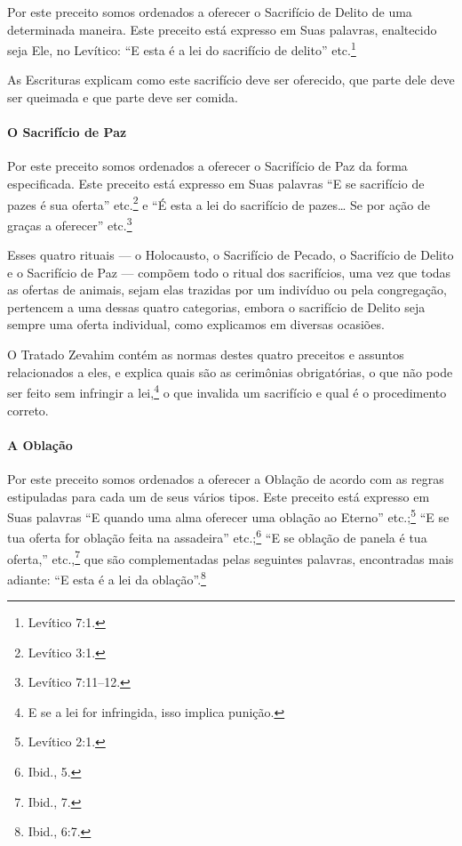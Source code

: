 \begin{multicols}{2}
Por este preceito somos ordenados a oferecer o Sacrifício de Delito de
uma determinada maneira. Este preceito está expresso em Suas palavras,
enaltecido seja Ele, no Levítico: ``E esta é a lei do sacrifício de
delito'' etc.\footnote{Levítico 7:1.}

As Escrituras explicam como este sacrifício deve ser oferecido, que
parte dele deve ser queimada e que parte deve ser comida.

\paragraph{O Sacrifício de Paz}

Por este preceito somos ordenados a oferecer o Sacrifício de Paz da
forma especificada. Este preceito está expresso em Suas palavras ``E se
sacrifício de pazes é sua oferta'' etc.\footnote{Levítico 3:1.} e ``É esta a lei
do sacrifício de pazes\ldots{} Se por ação de graças a oferecer'' etc.\footnote{Levítico 7:11--12.}

Esses quatro rituais --- o Holocausto, o Sacrifício de Pecado, o
Sacrifício de Delito e o Sacrifício de Paz --- compõem todo o ritual
dos sacrifícios, uma vez que todas as ofertas de animais, sejam elas
trazidas por um indivíduo ou pela congregação, pertencem a uma dessas
quatro categorias, embora o sacrifício de Delito seja sempre uma oferta
individual, como explicamos em diversas ocasiões.

O Tratado Zevahim\starr{} contém as normas destes quatro preceitos e assuntos
relacionados a eles, e explica quais são as cerimônias obrigatórias, o
que não pode ser feito sem infringir a lei,\footnote{E se a lei for infringida, isso implica punição.} o que
invalida um sacrifício e qual é o procedimento correto.

\paragraph{A Oblação}

Por este preceito somos ordenados a oferecer a Oblação de acordo com as
regras estipuladas para cada um de seus vários tipos. Este preceito está
expresso em Suas palavras ``E quando uma alma oferecer uma oblação ao
Eterno'' etc.;\footnote{Levítico 2:1.} ``E se tua oferta for oblação feita na
assadeira'' etc.;\footnote{Ibid., 5.} ``E se oblação de panela é tua oferta,''
etc.,\footnote{Ibid., 7.} que são complementadas pelas seguintes palavras,
encontradas mais adiante: ``E esta é a lei da oblação''.\footnote{Ibid., 6:7.}


\end{multicols}
